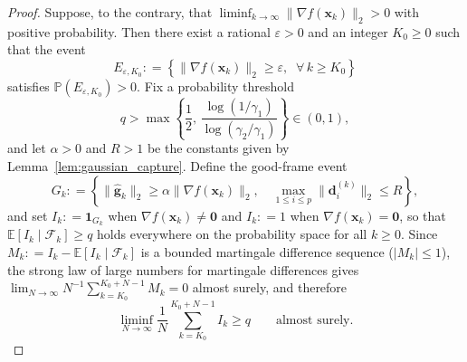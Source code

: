 \documentclass[smallextended]{svjour3}
\newcommand{\bx}{\bm{x}}
\newcommand{\bd}{\bm{d}}
\newcommand{\bg}{\bm{g}}
\providecommand{\coloneqq}{\mathrel{\mathop:}=}
\begin{document}
\begin{proof}
Suppose, to the contrary, that $\liminf_{k\to\infty}\|\nabla f(\bx_k)\|_2 > 0$ with positive probability. Then there exist a rational $\varepsilon > 0$ and an integer $K_0 \ge 0$ such that the event
\[
E_{\varepsilon, K_0} \coloneqq \left\{ \|\nabla f(\bx_k)\|_2 \ge \varepsilon, \;\;\forall\, k\ge K_0 \right\}
\]
satisfies $\mathbb P(E_{\varepsilon, K_0}) > 0$. Fix a probability threshold
\begin{equation}
\label{eq:q_condition}
q > \max\left\{ \frac{1}{2},\, \frac{\log(1/\gamma_1)}{\log(\gamma_2/\gamma_1)} \right\} \in (0, 1),
\end{equation}
and let $\alpha>0$ and $R>1$ be the constants given by Lemma~\ref{lem:gaussian_capture}. Define the good-frame event
\[
G_k \coloneqq \left\{ \|\hat{\bg}_k\|_2 \ge \alpha\|\nabla f(\bx_k)\|_2, \quad \max_{1\le i\le p}\|\bd_i^{(k)}\|_2\le R \right\},
\]
and set $I_k \coloneqq \mathbf{1}_{G_k}$ when $\nabla f(\bx_k) \ne \bm 0$ and $I_k \coloneqq 1$ when $\nabla f(\bx_k) = \bm 0$, so that $\mathbb E[I_k \mid \mathcal F_k] \ge q$ holds everywhere on the probability space for all $k\ge 0$. Since $M_k \coloneqq I_k - \mathbb E[I_k \mid \mathcal F_k]$ is a bounded martingale difference sequence ($|M_k| \le 1$), the strong law of large numbers for martingale differences gives $\lim_{N\to\infty} N^{-1}\sum_{k=K_0}^{K_0+N-1} M_k = 0$ almost surely, and therefore
\begin{equation}
\label{eq:slln_good_frames}
\liminf_{N\to\infty} \frac{1}{N} \sum_{k=K_0}^{K_0+N-1} I_k \ge q \qquad \text{almost surely}.
\end{equation}


\end{proof}
\end{document}
